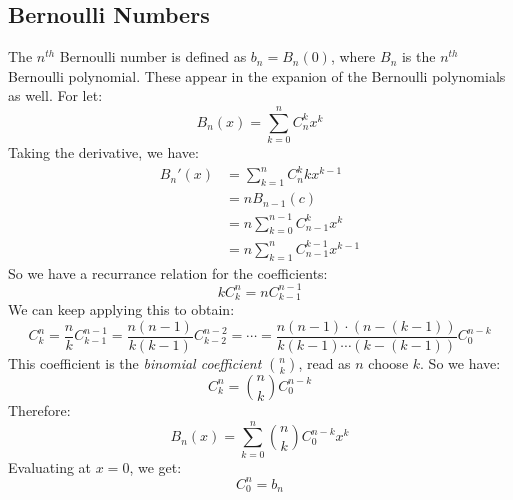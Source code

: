         \subsection{Bernoulli Numbers}
            The $n^{th}$ Bernoulli number is defined
            as $b_{n}=B_{n}(0)$, where $B_{n}$ is the
            $n^{th}$ Bernoulli polynomial. These appear in
            the expanion of the Bernoulli polynomials as well.
            For let:
            \begin{equation}
                B_{n}(x)=\sum_{k=0}^{n}C_{n}^{k}x^{k}
            \end{equation}
            Taking the derivative, we have:
            \begin{subequations}
                \begin{align}
                    B_{n}'(x)
                    &=\sum_{k=1}^{n}C_{n}^{k}kx^{k-1}\\
                    &=nB_{n-1}(c)\\
                    &=n\sum_{k=0}^{n-1}C_{n-1}^{k}x^{k}\\
                    &=n\sum_{k=1}^{n}C_{n-1}^{k-1}x^{k-1}
                \end{align}
            \end{subequations}
            So we have a recurrance relation for the coefficients:
            \begin{equation}
                kC_{k}^{n}=nC_{k-1}^{n-1}
            \end{equation}
            We can keep applying this to obtain:
            \begin{equation}
                C_{k}^{n}=\frac{n}{k}C_{k-1}^{n-1}
                =\frac{n(n-1)}{k(k-1)}C_{k-2}^{n-2}=\cdots
                =\frac{n(n-1)\cdot(n-(k-1))}{k(k-1)\cdots(k-(k-1))}
                C_{0}^{n-k}
            \end{equation}
            This coefficient is the \textit{binomial coefficient}
            $\binom{n}{k}$, read as $n$ choose $k$. So we have:
            \begin{equation}
                C_{k}^{n}=\binom{n}{k}C_{0}^{n-k}
            \end{equation}
            Therefore:
            \begin{equation}
                B_{n}(x)=\sum_{k=0}^{n}
                \binom{n}{k}C_{0}^{n-k}x^{k}
            \end{equation}
            Evaluating at $x=0$, we get:
            \begin{equation}
                C_{0}^{n}=b_{n}
            \end{equation}
